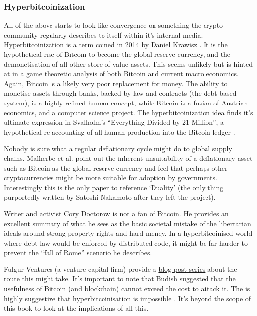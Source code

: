 \subsubsection{Hyperbitcoinization}
All of the above starts to look like convergence on something the crypto community regularly describes to itself within it's internal media. Hyperbitcoinization is a term coined in 2014 by Daniel Krawisz \cite{krawisz2014hyperbitcoinization}. It is the hypothetical rise of Bitcoin to become the global reserve currency, and the demonetisation of all other store of value assets. This seems unlikely but is hinted at in a game theoretic analysis of both Bitcoin and current macro economics. Again, Bitcoin is a likely very poor replacement for money. The ability to monetise assets through banks, backed by law and contracts (the debt based system), is a highly refined human concept, while Bitcoin is a fusion of Austrian economics, and a computer science project. The hyperbitcoinization idea finds it's ultimate expression in Svalholm's ``Everything Divided by 21 Million'', a hypothetical re-accounting of all human production into the Bitcoin ledger \cite{booth2022bitcoin}.\par
Nobody is sure what a \href{https://fredblog.stlouisfed.org/2022/07/inflation-and-deflation-with-a-fixed-money-supply/}{regular deflationary cycle} might do to global supply chains. Malherbe et al. point out the inherent unsuitability of a deflationary asset such as Bitcoin as the global reserve currency \cite{malherbe2019cryptocurrencies} and feel that perhaps other cryptocurrencies might be more suitable for adoption by governments.  Interestingly this is the only paper to reference `Duality' (the only thing purportedly written by Satoshi Nakamoto after they left the project). \par
Writer and activist Cory Doctorow is \href{https://onezero.medium.com/the-byzantine-premium-8411521db843}{not a fan of Bitcoin}. He provides an excellent summary of what he sees as the \href{https://doctorow.medium.com/finance-caused-the-fall-of-rome-fd091fa02973}{basic societal mistake} of the libertarian ideals around strong property rights and hard money. In a hyperbitcoinised world where debt law would be enforced by distributed code, it might be far harder to prevent the ``fall of Rome'' scenario he describes.  \par  
Fulgur Ventures (a venture capital firm) provide a \href{https://medium.com/@fulgur.ventures/the-roads-to-hyperbitcoinization-part-1-27dc84d0e5e5}{blog post series} about the route this might take. It's important to note that Budish suggested that the usefulness of Bitcoin (and blockchain) cannot exceed the cost to attack it. The is highly suggestive that hyperbitcoinisation is impossible \cite{budish2018economic}. It's beyond the scope of this book to look at the implications of all this. 

